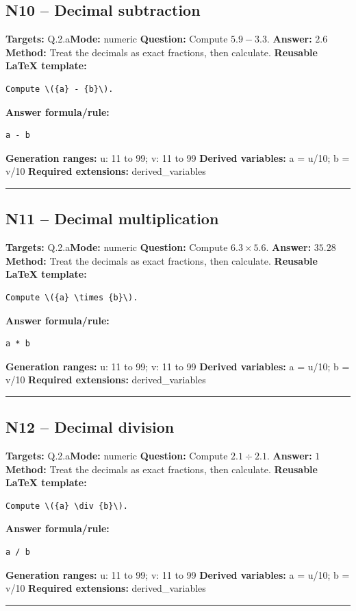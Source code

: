 \documentclass[11pt]{article}
\begin{document}
\subsection{N10 -- Decimal subtraction}
\textbf{Targets:} Q.2.a\quad\textbf{Mode:} numeric
\textbf{Question:} Compute \(5.9 - 3.3\).
\textbf{Answer:} \(2.6\)
\textbf{Method:} Treat the decimals as exact fractions, then calculate.
\textbf{Reusable LaTeX template:}
\begin{verbatim}
Compute \({a} - {b}\).
\end{verbatim}
\textbf{Answer formula/rule:}
\begin{verbatim}
a - b
\end{verbatim}
\textbf{Generation ranges:} u: 11 to 99; v: 11 to 99
\textbf{Derived variables:} a = u/10; b = v/10
\textbf{Required extensions:} derived\_variables
\medskip\hrule\medskip
\subsection{N11 -- Decimal multiplication}
\textbf{Targets:} Q.2.a\quad\textbf{Mode:} numeric
\textbf{Question:} Compute \(6.3 \times 5.6\).
\textbf{Answer:} \(35.28\)
\textbf{Method:} Treat the decimals as exact fractions, then calculate.
\textbf{Reusable LaTeX template:}
\begin{verbatim}
Compute \({a} \times {b}\).
\end{verbatim}
\textbf{Answer formula/rule:}
\begin{verbatim}
a * b
\end{verbatim}
\textbf{Generation ranges:} u: 11 to 99; v: 11 to 99
\textbf{Derived variables:} a = u/10; b = v/10
\textbf{Required extensions:} derived\_variables
\medskip\hrule\medskip
\subsection{N12 -- Decimal division}
\textbf{Targets:} Q.2.a\quad\textbf{Mode:} numeric
\textbf{Question:} Compute \(2.1 \div 2.1\).
\textbf{Answer:} \(1\)
\textbf{Method:} Treat the decimals as exact fractions, then calculate.
\textbf{Reusable LaTeX template:}
\begin{verbatim}
Compute \({a} \div {b}\).
\end{verbatim}
\textbf{Answer formula/rule:}
\begin{verbatim}
a / b
\end{verbatim}
\textbf{Generation ranges:} u: 11 to 99; v: 11 to 99
\textbf{Derived variables:} a = u/10; b = v/10
\textbf{Required extensions:} derived\_variables
\medskip\hrule\medskip
\end{document}
